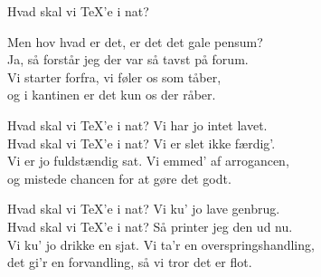 \begin{song}{Hvad skal vi \TeX'e i nat?}
  \begin{SBVerse}
    Men hov hvad er det, er det det gale pensum?\\
    Ja, så forstår jeg der var så tavst på forum.\\
    Vi starter forfra, vi føler os som tåber,\\
    og i kantinen er det kun os der råber.
  \end{SBVerse}

  \begin{SBChorus}
    Hvad skal vi \TeX'e i nat? Vi har jo intet lavet.\\
    Hvad skal vi \TeX'e i nat? Vi er slet ikke færdig'.\\
    Vi er jo fuldstændig sat. Vi emmed' af arrogancen,\\
    og mistede chancen for at gøre det godt.
  \end{SBChorus}

  \begin{SBChorus}
    Hvad skal vi \TeX'e i nat? Vi ku' jo lave genbrug.\\
    Hvad skal vi \TeX'e i nat? Så printer jeg den ud nu.\\
    Vi ku' jo drikke en sjat. Vi ta'r en overspringshandling,\\
    det gi'r en forvandling, så vi tror det er flot.
  \end{SBChorus}
\end{song}